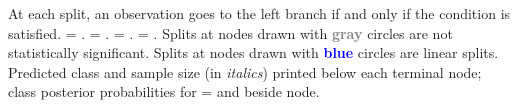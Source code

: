 \documentclass{article}
\begin{document}
\begin{landscape}
At each split, an observation goes to the left branch 
 if and only if the condition is satisfied.
\texttt{} = \texttt{}.
\texttt{} = \texttt{}.
\texttt{} = \texttt{}.
\texttt{} = \texttt{}.
 Splits at nodes drawn with \textbf{\textcolor{gray}{gray}} circles are not statistically significant.
 Splits at nodes drawn with \textbf{\textcolor{blue}{blue}} circles are linear splits.
Predicted class and sample size (in \emph{italics}) printed below each terminal node;
class posterior probabilities for \texttt{} =
 \texttt{} and \texttt{} beside node.
 \end{landscape}
 
\end{document}
